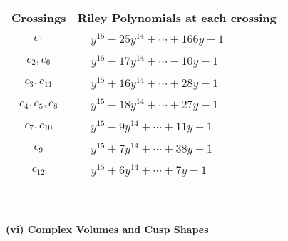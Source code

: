 \documentclass[1p]{elsarticle_modified}
\theoremstyle{definition}
\begin{document}
\begin{tabular}{m{50pt}|m{274pt}}
Crossings & \hspace{64pt}Riley Polynomials at each crossing \\
\hline $$\begin{aligned}c_{1}\end{aligned}$$&$\begin{aligned}
&y^{15}-25 y^{14}+\cdots+166 y-1
\end{aligned}$\\
\hline $$\begin{aligned}c_{2},c_{6}\end{aligned}$$&$\begin{aligned}
&y^{15}-17 y^{14}+\cdots-10 y-1
\end{aligned}$\\
\hline $$\begin{aligned}c_{3},c_{11}\end{aligned}$$&$\begin{aligned}
&y^{15}+16 y^{14}+\cdots+28 y-1
\end{aligned}$\\
\hline $$\begin{aligned}c_{4},c_{5},c_{8}\end{aligned}$$&$\begin{aligned}
&y^{15}-18 y^{14}+\cdots+27 y-1
\end{aligned}$\\
\hline $$\begin{aligned}c_{7},c_{10}\end{aligned}$$&$\begin{aligned}
&y^{15}-9 y^{14}+\cdots+11 y-1
\end{aligned}$\\
\hline $$\begin{aligned}c_{9}\end{aligned}$$&$\begin{aligned}
&y^{15}+7 y^{14}+\cdots+38 y-1
\end{aligned}$\\
\hline $$\begin{aligned}c_{12}\end{aligned}$$&$\begin{aligned}
&y^{15}+6 y^{14}+\cdots+7 y-1
\end{aligned}$\\
\hline
\end{tabular}\\~\\
\newpage\flushleft \textbf{(vi) Complex Volumes and Cusp Shapes}
\end{document}
